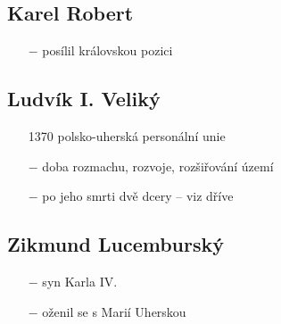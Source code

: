 \documentclass{article}
\begin{document}
\subsection*{Karel Robert}
\begin{itemize}
    \vspace{-0.5em}
    \setlength\itemsep{0.15em}
    \item[$-$] posílil královskou pozici
\end{itemize}

\subsection*{Ludvík I. Veliký}
\begin{itemize}
    \vspace{-0.5em}
    \setlength\itemsep{0.15em}
    \item[1370] polsko-uherská personální unie
    \item[$-$] doba rozmachu, rozvoje, rozšiřování území
    \item[$-$] po jeho smrti dvě dcery -- viz dříve
\end{itemize}

\subsection*{Zikmund Lucemburský}
\begin{itemize}
    \vspace{-0.5em}
    \setlength\itemsep{0.15em}
    \item[$-$] syn Karla IV.
    \item[$-$] oženil se s Marií Uherskou
\end{itemize}
\end{document}
